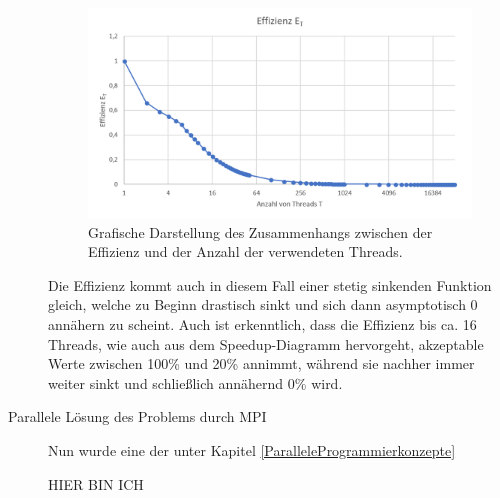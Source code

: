 \begin{description}
						\begin{figure}
							\centering	
							\includegraphics[width=12cm]{Abbildungen/Effizienz_Threads.png}
							\caption{Grafische Darstellung des Zusammenhangs zwischen der Effizienz und der Anzahl der verwendeten Threads.}
							\label{fig:Effizienz_Threads}
						\end{figure}
						
						Die Effizienz kommt auch in diesem Fall einer stetig sinkenden Funktion gleich, welche zu Beginn drastisch sinkt und sich dann asymptotisch 0 annähern zu scheint. Auch ist erkenntlich, dass die Effizienz bis ca. 16 Threads, wie auch aus dem Speedup-Diagramm hervorgeht, akzeptable Werte zwischen 100\% und 20\% annimmt, während sie nachher immer weiter sinkt und schließlich annähernd 0\% wird.

					\item[Parallele Lösung des Problems durch MPI]
					
						Nun wurde eine der unter Kapitel \ref{ParalleleProgrammierkonzepte}
					
						HIER BIN ICH
						
						
						
						
						
						
						
						
						
						
						

\end{description}
